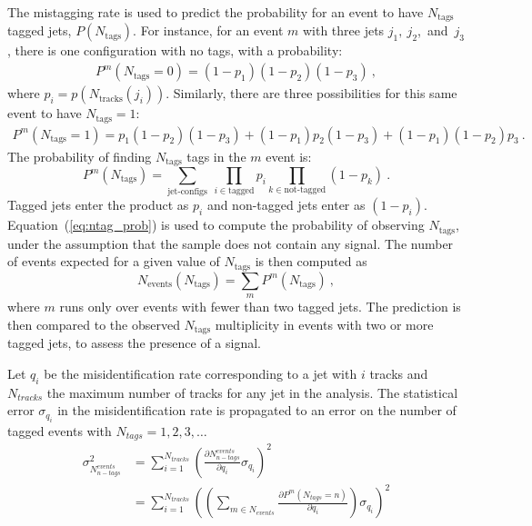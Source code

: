 The mistagging rate is used to predict the probability for an event to
have $N_\text{tags}$ tagged jets, $P(N_{\textrm{tags}})$. For instance, for an event $m$
with three jets $j_1, ~j_2$,~and~$ j_3$, there is one configuration with no tags,
with a probability:
\begin{align*} 
P^m(N_{\textrm{tags}}=0) = (1-p_1)(1-p_2)(1-p_3)~,
\end{align*} 
where $p_i = p(N_{\textrm{tracks}}(j_i))$.  Similarly, there are three
possibilities for this same event to have $N_{\textrm{tags}}=1$:
\begin{align*}
P^m(N_{\textrm{tags}}=1) = p_1(1-p_2)(1-p_3)
+  (1-p_1)p_2(1-p_3)
+  (1-p_1)(1-p_2)p_3~.
\end{align*}
The probability of finding $N_{\textrm{tags}}$  tags in the $m$ event is:
\begin{equation}
P^m(N_{\textrm{tags}}) = \sum_{\textrm{jet-configs}}~\prod_{i\in
  \textrm{tagged}} p_i \prod_{k \in \textrm{not-tagged}} (1-p_k)~.
\label{eq:ntag_prob}
\end{equation}
Tagged jets enter the product as $p_i$ and non-tagged jets enter as
$(1-p_i)$. Equation~(\ref{eq:ntag_prob}) is used to compute the
probability of observing $N_{\textrm{tags}}$, under the assumption
that the sample does not contain any signal. The number of events
expected for a given value of $N_{\textrm{tags}}$ is then computed as
\begin{equation}
N_{\textrm{events}}(N_{\textrm{tags}}) = \sum_{m} P^m(N_{\textrm{tags}})~,
\end{equation}
where $m$ runs only over events with fewer than two tagged jets.  The prediction is then compared
to the observed $N_{\textrm{tags}}$ multiplicity in events with two or
more tagged jets, to assess the presence of a signal. 

Let $q_i$ be the misidentification rate corresponding to a jet with $i$ tracks and
 $N_{tracks}$ the maximum number of tracks for any jet in the analysis.
 The statistical error $\sigma_{q_i}$ in the misidentification rate is propagated to 
an error on the number of tagged events with $N_{tags} = 1,2,3,\ldots$
\begin{align*}
\sigma_{N_{n-tags}^{events}}^2 &=  \sum_{i = 1}^{N_{tracks}} \left (\frac{\partial N_{n-tags}^{events}}{\partial q_i}  \sigma_{q_i} \right)^{2} \\
 &=  \sum_{i = 1}^{N_{tracks}} \left ( \left (\sum_{m\in N_{events}} \frac{\partial P^m(N_{tags}=n)}{\partial q_i} \right) \sigma_{q_i} \right)^{2} 
\label{eq:ntag_prob_error}
\end{align*}

